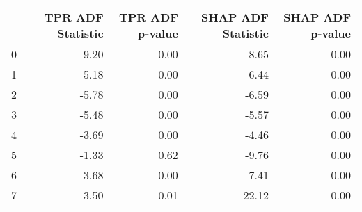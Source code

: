 \begin{tabular}{lrrrr}
\toprule
 & TPR ADF Statistic & TPR ADF p-value & SHAP ADF Statistic & SHAP ADF p-value \\
\midrule
0 & -9.20 & 0.00 & -8.65 & 0.00 \\
1 & -5.18 & 0.00 & -6.44 & 0.00 \\
2 & -5.78 & 0.00 & -6.59 & 0.00 \\
3 & -5.48 & 0.00 & -5.57 & 0.00 \\
4 & -3.69 & 0.00 & -4.46 & 0.00 \\
5 & -1.33 & 0.62 & -9.76 & 0.00 \\
6 & -3.68 & 0.00 & -7.41 & 0.00 \\
7 & -3.50 & 0.01 & -22.12 & 0.00 \\
\bottomrule
\end{tabular}
